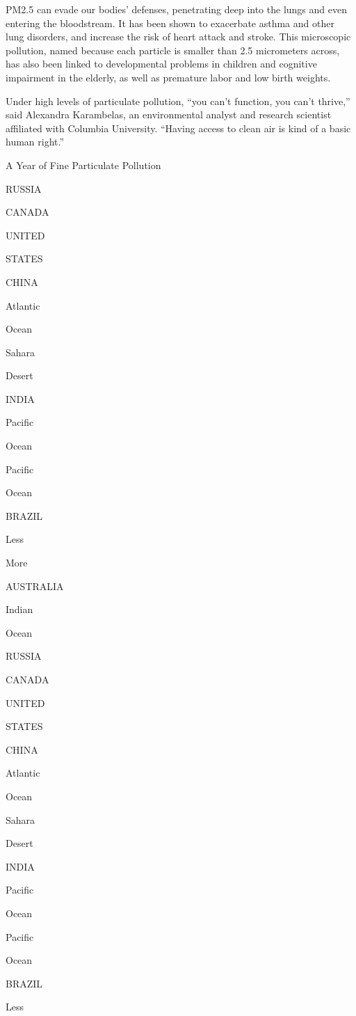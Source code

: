 PM2.5 can evade our bodies' defenses, penetrating deep into the lungs
and even entering the bloodstream. It has been shown to exacerbate
asthma and other lung disorders, and increase the risk of heart attack
and stroke. This microscopic pollution, named because each particle is
smaller than 2.5 micrometers across, has also been linked to
developmental problems in children and cognitive impairment in the
elderly, as well as premature labor and low birth weights.

Under high levels of particulate pollution, ``you can't function, you
can't thrive,'' said Alexandra Karambelas, an environmental analyst and
research scientist affiliated with Columbia University. ``Having access
to clean air is kind of a basic human right.''

A Year of Fine Particulate Pollution

RUSSIA

CANADA

UNITED

STATES

CHINA

Atlantic

Ocean

Sahara

Desert

INDIA

Pacific

Ocean

Pacific

Ocean

BRAZIL

Less

More

AUSTRALIA

Indian

Ocean

RUSSIA

CANADA

UNITED

STATES

CHINA

Atlantic

Ocean

Sahara

Desert

INDIA

Pacific

Ocean

Pacific

Ocean

BRAZIL

Less

